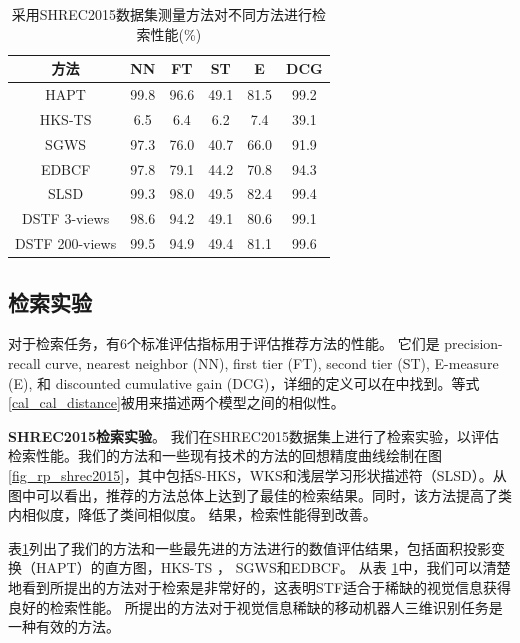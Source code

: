 \begin{table}[tbhp]
\caption{采用SHREC2015数据集测量方法对不同方法进行检索性能(\%)} \label{table_retrieval_shrec2015}
\begin{center}
\begin{tabular}{cccccc}  %
\hline  \hline
方法	    						&NN     &FT     &ST     &E      &DCG \\ 
\hline 
HAPT \cite{Giachetti2012Radial} 	&99.8	&96.6	&49.1	&81.5	 &99.2 \\
HKS-TS \cite{Lian2015SHREC}			&6.5	&6.4	&6.2	&7.4	 &39.1 \\
SGWS \cite{Li2013A}					&97.3	&76.0	&40.7   &66.0	 &91.9  \\
EDBCF \cite{Laga2013Geometry}		&97.8	&79.1 	&44.2	&70.8	 &94.3 \\
SLSD	\cite{Hamed2017Nonrigid}	&99.3	&98.0	&49.5	&82.4    &99.4	\\
DSTF 3-views   						&98.6  	&94.2  	&49.1  	&80.6  	 &99.1 \\ 
DSTF 200-views   					&99.5  	&94.9  	&49.4  &81.1  	 &99.6 \\ 
\hline  \hline      
\end{tabular}
\end{center} 
\end{table}

\subsection{检索实验}
对于检索任务，有6个标准评估指标用于评估推荐方法的性能。 它们是 precision-recall curve, nearest neighbor (NN), first tier (FT), second tier (ST), E-measure (E), 和 discounted cumulative gain (DCG)，详细的定义可以在\cite{shilane2004princeton}中找到。等式\eqref{cal_cal_distance}被用来描述两个模型之间的相似性。


\textbf {SHREC2015检索实验}。 我们在SHREC2015数据集上进行了检索实验，以评估检索性能。我们的方法和一些现有技术的方法的回想精度曲线绘制在图\ref{fig_rp_shrec2015}，其中包括S-HKS\cite {Bronstein2010Scale}，WKS\cite{Aubry2011The}和浅层学习形状描述符（SLSD）\cite{Hamed2017Nonrigid}。从图中可以看出，推荐的方法总体上达到了最佳的检索结果。同时，该方法提高了类内相似度，降低了类间相似度。 结果，检索性能得到改善。

表\ref{table_retrieval_shrec2015}列出了我们的方法和一些最先进的方法进行的数值评估结果，包括面积投影变换（HAPT）的直方图\cite {Giachetti2012Radial}，HKS-TS \cite {Lian2015SHREC}， SGWS\cite {Li2013A}和EDBCF\cite {Laga2013Geometry}。 从表 \ref {table_retrieval_shrec2015}中，我们可以清楚地看到所提出的方法对于检索是非常好的，这表明STF适合于稀缺的视觉信息获得良好的检索性能。 所提出的方法对于视觉信息稀缺的移动机器人三维识别任务是一种有效的方法。


